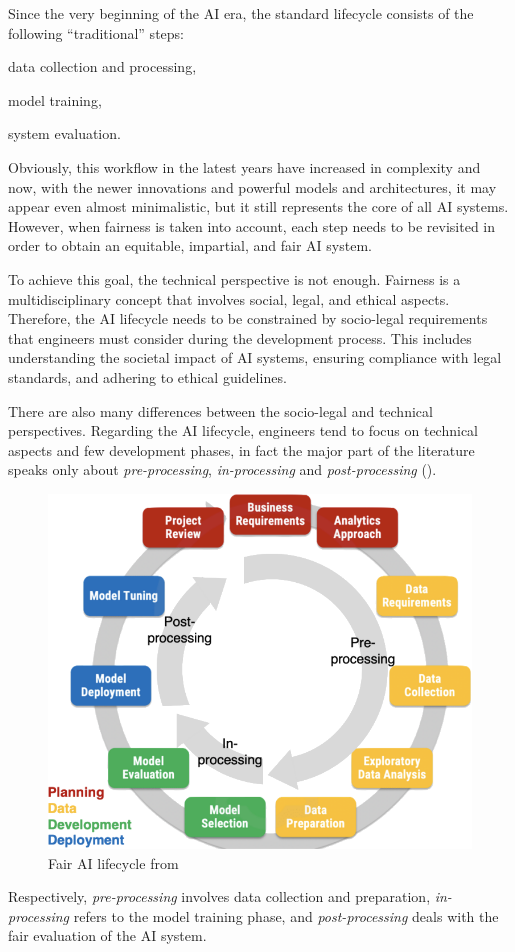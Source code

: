 \documentclass[12pt,a4paper,openright,twoside]{book}
\begin{document}

Since the very beginning of the \ac{AI} era, the standard lifecycle consists of the following ``traditional'' steps:
\begin{enumerate*}[label= (\roman*)]
    \item data collection and processing,
    \item model training,
    \item system evaluation.
\end{enumerate*}
%
Obviously, this workflow in the latest years have increased in complexity and now, with the newer innovations and powerful models and architectures, it may appear even almost minimalistic, but it still represents the core of all \ac{AI} systems.
%
However, when fairness is taken into account, each step needs to be revisited in order to obtain an equitable, impartial, and fair \ac{AI} system.

To achieve this goal, the technical perspective is not enough.
%
Fairness is a multidisciplinary concept that involves social, legal, and ethical aspects.
%
Therefore, the \ac{AI} lifecycle needs to be constrained by socio-legal requirements that engineers must consider during the development process.
%
This includes understanding the societal impact of \ac{AI} systems, ensuring compliance with legal standards, and adhering to ethical guidelines.

There are also many differences between the socio-legal and technical perspectives.
%
Regarding the \ac{AI} lifecycle, engineers tend to focus on technical aspects and few development phases, in fact the major part of the literature speaks only about \textit{pre-processing}, \textit{in-processing} and \textit{post-processing} ().
%
\begin{figure}
    \centering
    \includegraphics[width=.6\linewidth]{figures/ai-lifecycle.png}
    \caption{Fair \acs{AI} lifecycle from~\cite{DBLP:conf/ijcai/CalegariCMO23}}
    \label{fig:ai-lifecycle}
\end{figure}
%
Respectively, \textit{pre-processing} involves data collection and preparation, \textit{in-processing} refers to the model training phase, and \textit{post-processing} deals with the fair evaluation of the \ac{AI} system.
\end{document}

